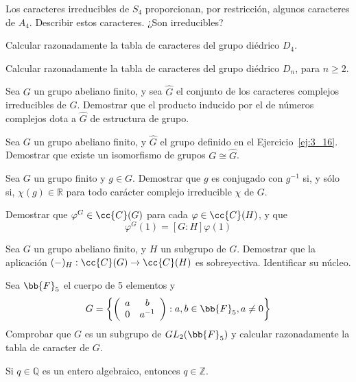 \begin{ejercicio}
    Los caracteres irreducibles de $S_4$ proporcionan, por restricción, algunos caracteres de $A_4$. Describir estos caracteres. ¿Son irreducibles?
\end{ejercicio}

\begin{ejerciciostar}
    Calcular razonadamente la tabla de caracteres del grupo diédrico $D_4$.
\end{ejerciciostar}

\begin{ejerciciostarstar}
    Calcular razonadamente la tabla de caracteres del grupo diédrico $D_n$, para $n\geq 2$.
\end{ejerciciostarstar}

\begin{ejercicio}\label{ej:3_16}
    Sea $G$ un grupo abeliano finito, y sea $\hat{G}$ el conjunto de los caracteres complejos irreducibles de $G$. Demostrar que el producto inducido por el de números complejos dota a $\hat{G}$ de estructura de grupo.
\end{ejercicio}

\begin{ejerciciostarstar}
    Sea $G$ un grupo abeliano finito, y $\hat{G}$ el grupo definido en el Ejercicio~\ref{ej:3_16}. Demostrar que existe un isomorfismo de grupos $G\cong \hat{G}$.
\end{ejerciciostarstar}

\begin{ejercicio}
    Sea $G$ un grupo finito y $g\in G$. Demostrar que $g$ es conjugado con $g^{-1}$ si, y sólo si, $\chi(g)\in \mathbb{R}$ para todo carácter complejo irreducible $\chi$ de $G$.
\end{ejercicio}

\begin{ejercicio}
    Demostrar que $\varphi^G \in \cc{C}(G)$ para cada $\varphi \in \cc{C}(H)$, y que
    \begin{equation*}
        \varphi^G(1) = [G:H]\varphi(1)
    \end{equation*}
\end{ejercicio}

\begin{ejerciciostar}
    Sea $G$ un grupo abeliano finito, y $H$ un subgrupo de $G$. Demostrar que la aplicación $(-)_H:\cc{C}(G)\to \cc{C}(H)$ es sobreyectiva. Identificar su núcleo.
\end{ejerciciostar}

\begin{ejerciciostar}
    Sea $\bb{F}_5$ el cuerpo de 5 elementos y
    \begin{equation*}
        G = \left\{\left(\begin{array}{cc}
            a & b \\
            0 & a^{-1} 
        \end{array}\right) : a,b\in \bb{F}_5, a\neq 0\right\}
    \end{equation*}
    Comprobar que $G$ es un subgrupo de $GL_2(\bb{F}_5)$ y calcular razonadamente la tabla de caracter de $G$.
\end{ejerciciostar}

\begin{ejercicio}
    Si $q\in \mathbb{Q}$ es un entero algebraico, entonces $q\in \mathbb{Z}$.
\end{ejercicio}
